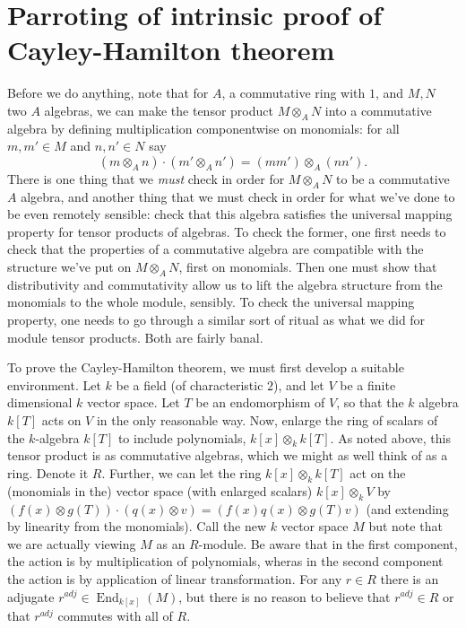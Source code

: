 \documentclass[18pt]{amsart}
\newcommand{\End}{\operatorname{End}}
\begin{document}
\section{Parroting of intrinsic proof of Cayley-Hamilton theorem}
	Before we do anything, note that for $A$, a commutative ring with $1$, and $M,N$ two $A$ algebras, we can make the tensor product $M\otimes_A N$ into a commutative algebra by defining multiplication componentwise on monomials: for all $m,m'\in M$ and $n,n'\in N$ say 
	\begin{equation*}
		(m\otimes_A n) \cdot (m'\otimes_A n')=(mm')\otimes_A (nn').
	\end{equation*}
There is one thing that we \emph{must} check in order for $M\otimes_A N$ to be a commutative $A$ algebra, and another thing that we must check in order for what we've done to be even remotely sensible: check that this algebra satisfies the universal mapping property for tensor products of algebras. To check the former, one first needs to check that the properties of a commutative algebra are compatible with the structure we've put on $M\otimes_A N$, first on monomials. Then one must show that distributivity and commutativity allow us to lift the algebra structure from the monomials to the whole module, sensibly. To check the universal mapping property, one needs to go through a similar sort of ritual as what we did for module tensor products. Both are fairly banal.

	To prove the Cayley-Hamilton theorem, we must first develop a suitable environment. Let $k$ be a field (of characteristic $2$), and let $V$ be a finite dimensional $k$ vector space. Let $T$ be an endomorphism of $V$, so that the $k$ algebra $k[T]$ acts on $V$ in the only reasonable way. Now, enlarge the ring of scalars of the $k$-algebra $k[T]$ to include polynomials, $k[x]\otimes_k k[T]$. As noted above, this tensor product is as commutative algebras, which we might as well think of as a ring. Denote it $R$. Further, we can let the ring $k[x]\otimes_k k[T]$ act on the (monomials in the) vector space (with enlarged scalars) $k[x] \otimes_k V$ by $(f(x)\otimes g(T))\cdot(q(x)\otimes v)=(f(x)q(x)\otimes g(T)v)$ (and extending by linearity from the monomials). Call the new $k$ vector space $M$ but note that we are actually viewing $M$ as an $R$-module. Be aware that in the first component, the action is by multiplication of polynomials, wheras in the second component the action is by application of linear transformation. For any $r\in R$ there is an adjugate $r^{adj} \in \End_{k[x]}(M)$, but there is no reason to believe that $r^{adj} \in R$ or that $r^{adj}$ commutes with all of $R$.
	
\end{document}
